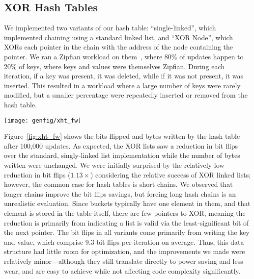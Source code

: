 \subsection{XOR Hash Tables}

We implemented two variants of our hash table: ``single-linked'', which
implemented chaining using a standard linked list, and
``XOR Node'', which
XORs each pointer in the chain with the address of the node containing the pointer.
We ran a Zipfian workload on them~\cite{zipf}, where 80\% of updates happen to
20\% of keys, where keys and values were
themselves Zipfian. During each iteration, if a key was present, it was deleted, while
if it was not present, it was inserted. This resulted in a workload where a
large number of keys were rarely modified, but a smaller percentage were
repeatedly inserted or removed from the hash table.

\begin{SCfigure}
	\centering
	\texttt{[image: genfig/xht\_fw]}
	\caption[XOR hash table characteristics]{Memory characteristics of XOR hash table variants under Zipfian
		workload.}
	\label{fig:xht_fw}
\end{SCfigure}


Figure~\ref{fig:xht_fw} shows the bits flipped and bytes written by the hash
table after 100,000 updates. As expected, the XOR lists saw a reduction in bit
flips over the standard, singly-linked list implementation while the number of
bytes written were unchanged. We were initially surprised by the relatively low
reduction in bit flips ($1.13\times$) considering the relative success of XOR linked
lists; however, the common case for hash tables is short chains. We observed
that longer chains improve the bit flips savings, but forcing long hash chains is
an unrealistic evaluation. Since buckets typically have one element in them, and
that element is stored in the table itself, there are few pointers to XOR,
meaning the reduction is primarily from indicating a list is valid via the
least-significant bit of the next pointer. The bit flips in all variants come
primarily from writing the key and value, which comprise 9.3 bit flips per
iteration on average. Thus, this data structure had little room for optimization,
and the improvements we made were relatively minor---although they still
translate directly to power saving and less wear, and are easy to achieve while
not affecting code complexity significantly.

